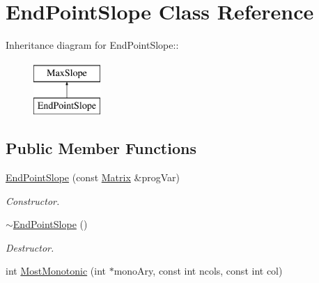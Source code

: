 \hypertarget{classEndPointSlope}{
\section{EndPointSlope Class Reference}
\label{da/d7d/classEndPointSlope}
}
Inheritance diagram for EndPointSlope::\begin{figure}[H]
\begin{center}
\leavevmode
\includegraphics[height=2cm]{da/d7d/classEndPointSlope}
\end{center}
\end{figure}
\subsection*{Public Member Functions}
\begin{DoxyCompactItemize}
\item 
\hypertarget{classEndPointSlope_aa1c680c5137b40a465d2433e636892ce}{
\hyperlink{classEndPointSlope_aa1c680c5137b40a465d2433e636892ce}{EndPointSlope} (const \hyperlink{classMatrix}{Matrix} \&progVar)}
\label{da/d7d/classEndPointSlope_aa1c680c5137b40a465d2433e636892ce}

\begin{DoxyCompactList}\small\item\em Constructor. \item\end{DoxyCompactList}\item 
\hypertarget{classEndPointSlope_a37cf0a75d426b64fc50a8a76f45beb1f}{
\hyperlink{classEndPointSlope_a37cf0a75d426b64fc50a8a76f45beb1f}{$\sim$EndPointSlope} ()}
\label{da/d7d/classEndPointSlope_a37cf0a75d426b64fc50a8a76f45beb1f}

\begin{DoxyCompactList}\small\item\em Destructor. \item\end{DoxyCompactList}\item 
int \hyperlink{classEndPointSlope_a70417721fe8a60669a67d19a7855bef5}{MostMonotonic} (int $\ast$monoAry, const int ncols, const int col)
\end{DoxyCompactItemize}


